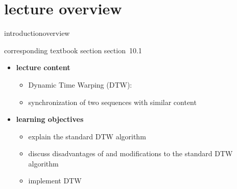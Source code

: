


\subtitle{Module 10.1: Alignment~---~Dynamic Time Warping}


	

    \section[overview]{lecture overview}
        \begin{frame}{introduction}{overview}
            \begin{block}{corresponding textbook section}
                    section~10.1
            \end{block}

            \begin{itemize}
                \item   \textbf{lecture content}
                    \begin{itemize}
                        \item   Dynamic Time Warping (DTW):
                        \item[] synchronization of two sequences with similar content
                    \end{itemize}
                \bigskip
                \item<2->   \textbf{learning objectives}
                    \begin{itemize}
                        \item   explain the standard DTW algorithm
                        \item   discuss disadvantages of and modifications to the standard DTW algorithm
                        \item   implement DTW
                    \end{itemize}
            \end{itemize}
        \end{frame}

